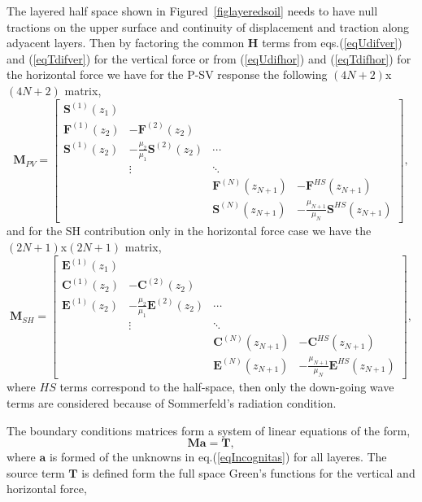 \documentclass[preprint,5p,times]{elsarticle}
\begin{document}
The layered half space shown in Figured~\ref{figlayeredsoil} needs to have null tractions on the upper surface and continuity of displacement and traction along adyacent layers. Then by factoring the common $\boldsymbol{H}$ terms from  eqs.(\ref{eqUdifver}) and (\ref{eqTdifver}) for the vertical force or from  (\ref{eqUdifhor}) and (\ref{eqTdifhor}) for the horizontal force we have for the P-SV response the following $(4N+2)$x$(4N+2)$ matrix,
\begin{equation}
\boldsymbol{M}_{PV} = \left[\begin{matrix}
\boldsymbol{S}^{(1)}(z_1) \\
\boldsymbol{F}^{(1)}(z_2) & -\boldsymbol{F}^{(2)}(z_2) \\
\boldsymbol{S}^{(1)}(z_2) & -\frac{\mu_2}{\mu_1}\boldsymbol{S}^{(2)}(z_2)& \cdots \\
& \vdots & \ddots \\
& & \boldsymbol{F}^{(N)}(z_{N+1}) & -\boldsymbol{F}^{HS}(z_{N+1}) \\
& & \boldsymbol{S}^{(N)}(z_{N+1}) & -\frac{\mu_{N+1}}{\mu_N} \boldsymbol{S}^{HS}(z_{N+1})
\end{matrix}\right],
\end{equation}
and for the SH contribution only in the horizontal force case we have the $(2N+1)$x$(2N+1)$ matrix,
\begin{equation}
\boldsymbol{M}_{SH} = \left[\begin{matrix}
\boldsymbol{E}^{(1)}(z_1) \\
\boldsymbol{C}^{(1)}(z_2) & -\boldsymbol{C}^{(2)}(z_2) \\
\boldsymbol{E}^{(1)}(z_2) & -\frac{\mu_2}{\mu_1}\boldsymbol{E}^{(2)}(z_2)& \cdots \\
& \vdots & \ddots \\
& & \boldsymbol{C}^{(N)}(z_{N+1}) & -\boldsymbol{C}^{HS}(z_{N+1}) \\
& & \boldsymbol{E}^{(N)}(z_{N+1}) & -\frac{\mu_{N+1}}{\mu_N} \boldsymbol{E}^{HS}(z_{N+1})
\end{matrix}\right],
\end{equation}
where $HS$ terms correspond to the half-space, then only the down-going wave terms are considered because of Sommerfeld's radiation condition.

The boundary conditions matrices form a system of linear equations of the form,
\begin{equation}
	\boldsymbol{M}\boldsymbol{a} = \boldsymbol{T},
\end{equation}
where $\boldsymbol{a}$ is formed of the unknowns in eq.(\ref{eqIncognitas}) for all layeres. The source term $ \boldsymbol{T}$ is defined form the full space Green's functions for the vertical and horizontal force,
\end{document}
